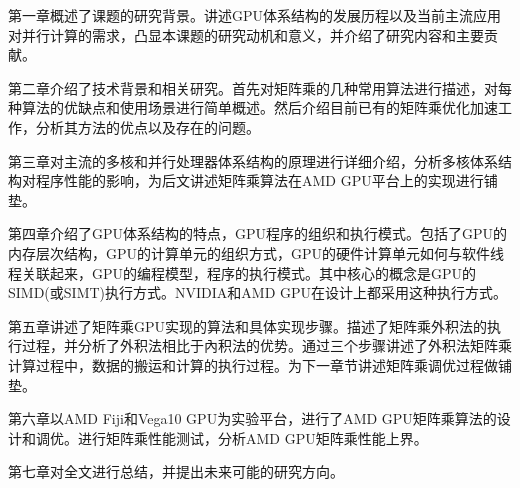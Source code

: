 第一章概述了课题的研究背景。讲述GPU体系结构的发展历程以及当前主流应用对并行计算的需求，凸显本课题的研究动机和意义，并介绍了研究内容和主要贡献。

第二章介绍了技术背景和相关研究。首先对矩阵乘的几种常用算法进行描述，对每种算法的优缺点和使用场景进行简单概述。然后介绍目前已有的矩阵乘优化加速工作，分析其方法的优点以及存在的问题。

第三章对主流的多核和并行处理器体系结构的原理进行详细介绍，分析多核体系结构对程序性能的影响，为后文讲述矩阵乘算法在AMD GPU平台上的实现进行铺垫。

第四章介绍了GPU体系结构的特点，GPU程序的组织和执行模式。包括了GPU的内存层次结构，GPU的计算单元的组织方式，GPU的硬件计算单元如何与软件线程关联起来，GPU的编程模型，程序的执行模式。其中核心的概念是GPU的SIMD(或SIMT)执行方式。NVIDIA和AMD GPU在设计上都采用这种执行方式。

第五章讲述了矩阵乘GPU实现的算法和具体实现步骤。描述了矩阵乘外积法的执行过程，并分析了外积法相比于內积法的优势。通过三个步骤讲述了外积法矩阵乘计算过程中，数据的搬运和计算的执行过程。为下一章节讲述矩阵乘调优过程做铺垫。

第六章以AMD Fiji和Vega10 GPU为实验平台，进行了AMD GPU矩阵乘算法的设计和调优。进行矩阵乘性能测试，分析AMD GPU矩阵乘性能上界。

第七章对全文进行总结，并提出未来可能的研究方向。



